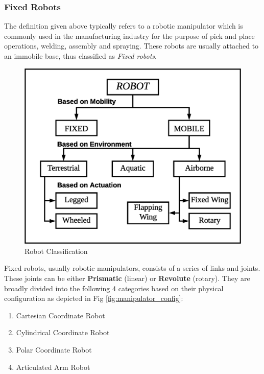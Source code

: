 \begin{spacing}{2}
\subsubsection*{Fixed Robots}
The definition given above typically refers to a robotic manipulator which is commonly used in the manufacturing industry for the purpose of pick and place operations, welding, assembly and spraying. These robots are usually attached to an immobile base, thus classified as \textit{Fixed robots}. 
\begin{figure}
    \centering
    \includegraphics[width=0.8\linewidth]{image/robot_classification.eps}
    \caption{Robot Classification}
    \label{fig:classification}
\end{figure}

 Fixed robots, usually robotic manipulators, consists of a series of links and joints. These joints can be either \textbf{Prismatic} (linear) or \textbf{Revolute} (rotary). They are broadly divided into the following 4 categories based on their physical configuration as depicted in Fig \ref{fig:manipulator_config}:
\begin{enumerate}
    \item Cartesian Coordinate Robot
    \item Cylindrical Coordinate Robot
    \item Polar Coordinate Robot
    \item Articulated Arm Robot
\end{enumerate}

\begin{figure}[h]
 

\end{figure}
\end{spacing}
